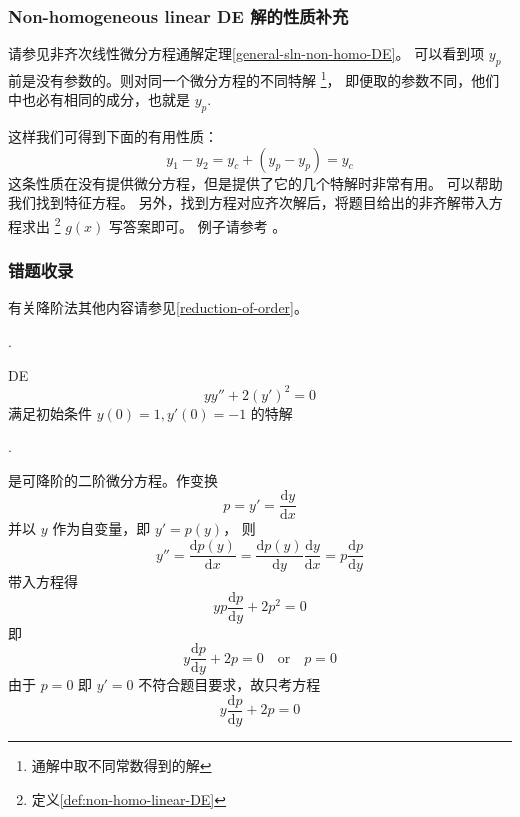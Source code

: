 \subsubsection{Non-homogeneous linear DE 解的性质补充}

请参见非齐次线性微分方程通解定理\ref{general-sln-non-homo-DE}。
可以看到项 $y_p$ 前是没有参数的。则对同一个微分方程的不同特解
\footnote{通解中取不同常数得到的解}，
即便取的参数不同，他们中也必有相同的成分，也就是
$y_p$.

这样我们可得到下面的有用性质：
\begin{equation}
    y_1 - y_2 = y_c + (y_p - y_p) = y_c
\end{equation}
这条性质在没有提供微分方程，但是提供了它的几个特解时非常有用。
可以帮助我们找到特征方程。
另外，找到方程对应齐次解后，将题目给出的非齐解带入方程求出
\footnote{定义\ref{def:non-homo-linear-DE}}
$g(x)$ 写答案即可。
例子请参考
\cite[page 145, pdf 156, example 3(7)]{we}。

\subsubsection{错题收录}

有关降阶法其他内容请参见\ref{reduction-of-order}。

\cite[question 77]{w660}.

\begin{example}
    DE 
    \[
        yy'' + 2(y')^2 = 0
    \] 
    满足初始条件 $y(0) = 1, y'(0) = -1$ 的特解

    \cite[question 80]{w660}.

    是可降阶的二阶微分方程。作变换
    \[
        p = y' = \dfrac{\mathrm{d}y}{\mathrm{d}x}
    \]
    并以 $y$ 作为自变量，即 $y' = p(y)$，
    则
    \[
        y'' = \dfrac{\mathrm{d}p(y)}{\mathrm{d}x} 
        = \dfrac{\mathrm{d}p(y)}{\mathrm{d}y} \dfrac{\mathrm{d}y}{\mathrm{d}x} 
        = p \dfrac{\mathrm{d}p}{\mathrm{d}y}
    \]
    带入方程得
    \[
        yp \dfrac{\mathrm{d}p}{\mathrm{d}y} + 2p^2 = 0
    \]
    即
    \[
        y \dfrac{\mathrm{d}p}{\mathrm{d}y} + 2p = 0 \quad \mbox{or} \quad p = 0
    \]
    由于 $p=0$ 即 $y' = 0$ 不符合题目要求，故只考方程
    \[
        y \dfrac{\mathrm dp}{\mathrm dy} + 2p = 0
    \]
\end{example}
